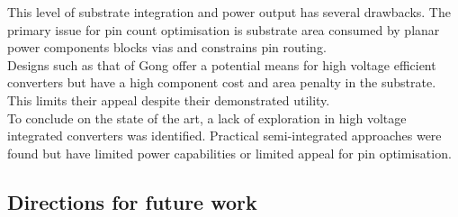 \documentclass[letterpaper,twocolumn,10pt]{article}
\begin{document}
This level of substrate integration and power output has several drawbacks. The primary issue for pin count optimisation is substrate area consumed by planar power components blocks vias and constrains pin routing.\\
Designs such as that of Gong offer a potential means for high voltage efficient converters but have a high component cost and area penalty in the substrate. This limits their appeal despite their demonstrated utility.\\       
\indent To conclude on the state of the art, a lack of exploration in high voltage integrated converters was identified. Practical semi-integrated approaches were found but have limited power capabilities or limited appeal for pin optimisation. 

\subsection{Directions for future work}
\end{document}
